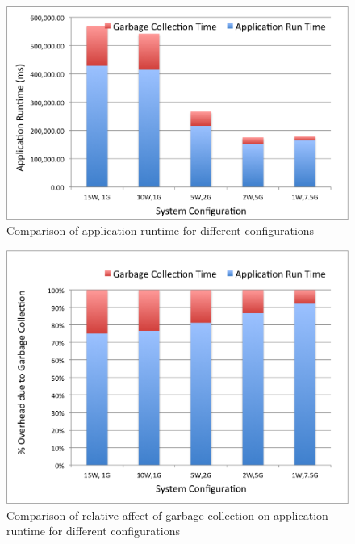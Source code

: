 \begin{figure}[!ht]
\caption{Comparison of application runtime for different configurations}
\label{fig:exp4}
\includegraphics[scale=0.50]{./images/exp4.png}
\end{figure}

\begin{figure}[!ht]
\caption{Comparison of relative affect of garbage collection on application runtime for different configurations}
\label{fig:exp4_2}
\includegraphics[scale=0.50]{./images/exp4_2.png}
\end{figure}

